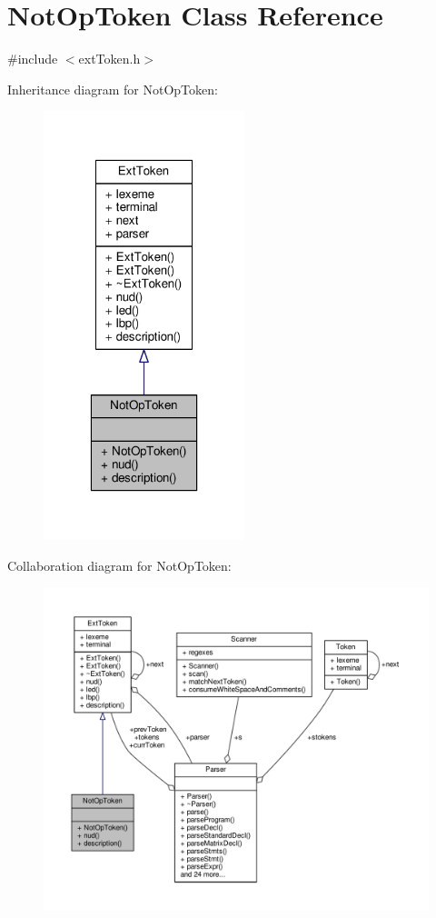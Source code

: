 \hypertarget{classNotOpToken}{\section{Not\-Op\-Token Class Reference}
\label{classNotOpToken}
}


{\ttfamily \#include $<$ext\-Token.\-h$>$}



Inheritance diagram for Not\-Op\-Token\-:\nopagebreak
\begin{figure}[H]
\begin{center}
\leavevmode
\includegraphics[width=166pt]{classNotOpToken__inherit__graph}
\end{center}
\end{figure}


Collaboration diagram for Not\-Op\-Token\-:\nopagebreak
\begin{figure}[H]
\begin{center}
\leavevmode
\includegraphics[width=350pt]{classNotOpToken__coll__graph}
\end{center}
\end{figure}
